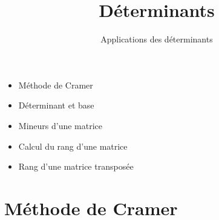 

   





\title{{\bf Déterminants}}
\subtitle{Applications des déterminants}

\begin{frame}
  
  \debutmontitre

  \pause

{\footnotesize
\hfill
{}
\begin{minipage}{0.6\textwidth}
  \begin{itemize}
    \item<3-> Méthode de Cramer
    \item<4-> Déterminant et base
    \item<5-> Mineurs d'une matrice
    \item<6-> Calcul du rang d'une matrice
    \item<7-> Rang d'une matrice transposée
  \end{itemize}
\end{minipage}
}

\end{frame}

\setcounter{framenumber}{0}


\section{Méthode de Cramer}

